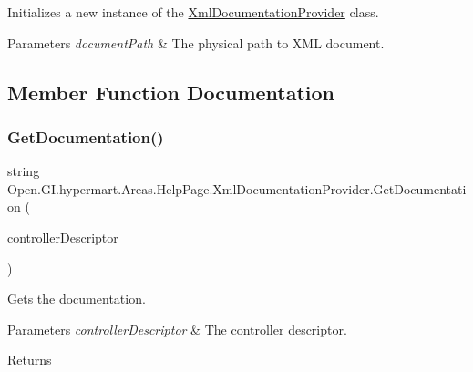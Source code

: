 Initializes a new instance of the \hyperlink{class_open_1_1_g_i_1_1hypermart_1_1_areas_1_1_help_page_1_1_xml_documentation_provider}{Xml\+Documentation\+Provider} class. 


\begin{DoxyParams}{Parameters}
{\em document\+Path} & The physical path to X\+ML document.\\
\hline
\end{DoxyParams}


\subsection{Member Function Documentation}
\hypertarget{class_open_1_1_g_i_1_1hypermart_1_1_areas_1_1_help_page_1_1_xml_documentation_provider_a05e11e0de4ff25a0e602ce9e5e916056}{}\label{class_open_1_1_g_i_1_1hypermart_1_1_areas_1_1_help_page_1_1_xml_documentation_provider_a05e11e0de4ff25a0e602ce9e5e916056} 
\subsubsection{\texorpdfstring{Get\+Documentation()}{GetDocumentation()}\hspace{0.1cm}{\footnotesize\ttfamily [1/5]}}
{\footnotesize\ttfamily string Open.\+G\+I.\+hypermart.\+Areas.\+Help\+Page.\+Xml\+Documentation\+Provider.\+Get\+Documentation (\begin{DoxyParamCaption}\item[{Http\+Controller\+Descriptor}]{controller\+Descriptor }\end{DoxyParamCaption})}



Gets the documentation. 


\begin{DoxyParams}{Parameters}
{\em controller\+Descriptor} & The controller descriptor.\\
\hline
\end{DoxyParams}
\begin{DoxyReturn}{Returns}

\end{DoxyReturn}
\hypertarget{class_open_1_1_g_i_1_1hypermart_1_1_areas_1_1_help_page_1_1_xml_documentation_provider_ad27b3bee09fd9709d46eb720bff4b860}{}\label{class_open_1_1_g_i_1_1hypermart_1_1_areas_1_1_help_page_1_1_xml_documentation_provider_ad27b3bee09fd9709d46eb720bff4b860} 
